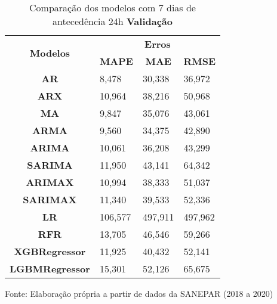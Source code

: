 \begin{table}[H]
	\centering
	\caption{Comparação dos modelos com 7 dias de antecedência 24h \textbf{Validação} }\label{tb:10-24vld}
	\begin{tabular}{@{}clll@{}}
		\toprule
		\multirow{2}{*}{\textbf{Modelos}} & \multicolumn{3}{c}{\textbf{Erros}}                                                                       \\ \cmidrule(l){2-4} 
		& \multicolumn{1}{c}{\textbf{MAPE}} & \multicolumn{1}{c}{\textbf{MAE}} & \multicolumn{1}{c}{\textbf{RMSE}} \\ \hline
\textbf{AR}                       & 8,478                             & 30,338                           & 36,972                            \\
\textbf{ARX}                      & 10,964                            & 38,216                           & 50,968                            \\
\textbf{MA}                       & 9,847                             & 35,076                           & 43,061                            \\
\textbf{ARMA}                     & 9,560                             & 34,375                           & 42,890                            \\
\textbf{ARIMA}                    & 10,061                            & 36,208                           & 43,299                            \\
\textbf{SARIMA}                   & 11,950                            & 43,141                           & 64,342                            \\
\textbf{ARIMAX}                   & 10,994                            & 38,333                           & 51,037                            \\
\textbf{SARIMAX}                  & 11,340                            & 39,533                           & 52,336                            \\
\textbf{LR}        & 106,577                           & 497,911                          & 497,962                           \\
\textbf{RFR}  & 13,705                            & 46,546                           & 59,266                            \\
\textbf{XGBRegressor}             & 11,925                            & 40,432                           & 52,141                            \\
\textbf{LGBMRegressor}            & 15,301                            & 52,126                           & 65,675                            \\ \bottomrule
	\end{tabular}

Fonte: Elaboração própria a partir de dados da SANEPAR (2018 a 2020)
\end{table}

